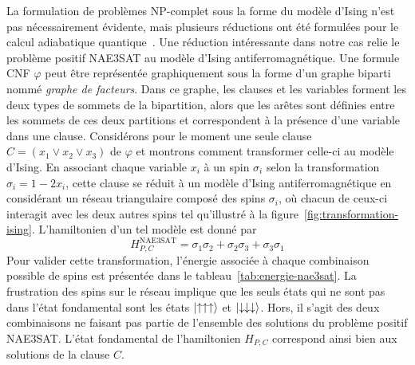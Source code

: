 La formulation de problèmes \textsf{NP}-complet sous la forme du modèle d'Ising n'est pas nécessairement évidente, mais plusieurs réductions ont été formulées pour le calcul adiabatique quantique~\cite{lucasIsingFormulationsMany2014,lodewijksMappingNPhardNPcomplete2020}. Une réduction intéressante dans notre cas relie le problème positif NAE3SAT au modèle d'Ising antiferromagnétique. Une formule CNF $\varphi$ peut être représentée graphiquement sous la forme d'un graphe biparti nommé \textit{graphe de facteurs}. Dans ce graphe, les clauses et les variables forment les deux types de sommets de la bipartition, alors que les arêtes sont définies entre les sommets de ces deux partitions et correspondent à la présence d'une variable dans une clause. Considérons pour le moment une seule clause $C = (x_{1} \lor x_{2} \lor x_{3})$ de $\varphi$ et montrons comment transformer celle-ci au modèle d'Ising. En associant chaque variable $x_{i}$ à un spin $\sigma_{i}$ selon la transformation $\sigma_{i} = 1 - 2x_{i}$, cette clause se réduit à un modèle d'Ising antiferromagnétique en considérant un réseau triangulaire composé des spins $\sigma_{i}$, où chacun de ceux-ci interagit avec les deux autres spins tel qu'illustré à la figure~\ref{fig:transformation-ising}. L'hamiltonien d'un tel modèle est donné par
\begin{equation}
    H_{P, C}^{\text{NAE3SAT}} = \sigma_{1}\sigma_{2} + \sigma_{2}\sigma_{3} + \sigma_{3}\sigma_{1}
\end{equation}
Pour valider cette transformation, l'énergie associée à chaque combinaison possible de spins est présentée dans le tableau~\ref{tab:energie-nae3sat}. La frustration des spins sur le réseau implique que les seuls états qui ne sont pas dans l'état fondamental sont les états $\ket{\uparrow \uparrow \uparrow}$ et $\ket{\downarrow \downarrow \downarrow}$. Hors, il s'agit des deux combinaisons ne faisant pas partie de l'ensemble des solutions du problème positif NAE3SAT. L'état fondamental de l'hamiltonien $H_{P, C}$ correspond ainsi bien aux solutions de la clause $C$.

